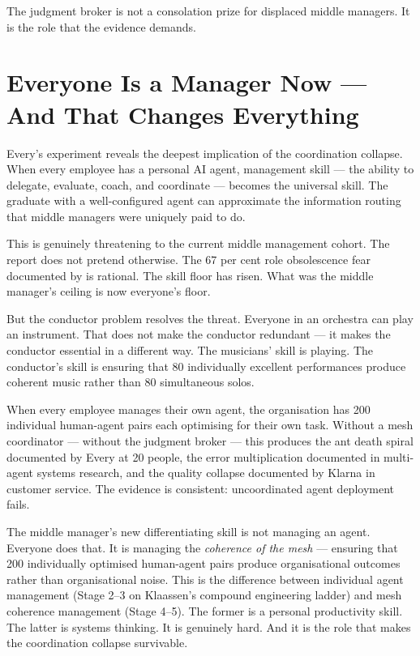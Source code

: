 The judgment broker is not a consolation prize for displaced middle managers. It is the role that the evidence demands.

\section{Everyone Is a Manager Now --- And That Changes Everything}

Every's experiment \parencite{Shipper2026} reveals the deepest implication of the coordination collapse. When every employee has a personal AI agent, management skill --- the ability to delegate, evaluate, coach, and coordinate --- becomes the universal skill. The graduate with a well-configured agent can approximate the information routing that middle managers were uniquely paid to do.

This is genuinely threatening to the current middle management cohort. The report does not pretend otherwise. The 67 per cent role obsolescence fear documented by \textcite{Capgemini2025} is rational. The skill floor has risen. What was the middle manager's ceiling is now everyone's floor.

But the conductor problem resolves the threat. Everyone in an orchestra can play an instrument. That does not make the conductor redundant --- it makes the conductor essential in a different way. The musicians' skill is playing. The conductor's skill is ensuring that 80 individually excellent performances produce coherent music rather than 80 simultaneous solos.

When every employee manages their own agent, the organisation has 200 individual human-agent pairs each optimising for their own task. Without a mesh coordinator --- without the judgment broker --- this produces the ant death spiral documented by Every at 20 people, the error multiplication documented in multi-agent systems research, and the quality collapse documented by Klarna in customer service. The evidence is consistent: uncoordinated agent deployment fails.

The middle manager's new differentiating skill is not managing an agent. Everyone does that. It is managing the \emph{coherence of the mesh} --- ensuring that 200 individually optimised human-agent pairs produce organisational outcomes rather than organisational noise. This is the difference between individual agent management (Stage 2--3 on Klaassen's compound engineering ladder) and mesh coherence management (Stage 4--5). The former is a personal productivity skill. The latter is systems thinking. It is genuinely hard. And it is the role that makes the coordination collapse survivable.


